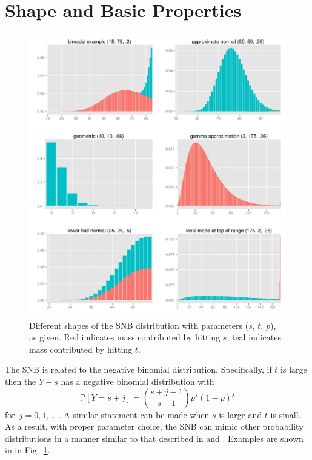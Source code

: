 \documentclass[review]{elsarticle}
\begin{document}
\section{Shape and Basic Properties}

\begin{figure}[p!]
\begin{center}
\includegraphics[width=\textwidth]{shapes.pdf}
\end{center}
\caption{Different shapes of the SNB distribution with parameters ($s$, $t$, $p$), as given. Red indicates mass contributed by hitting $s$, teal indicates
mass contributed by hitting $t$. \label{shapes.fig}}
\end{figure}

The SNB is related to the negative 
binomial distribution. Specifically, if $t$ is large then the $Y-s$ has a 
negative binomial distribution with
\begin{equation*}                                    %
\mathbb{P}[Y=s+j]        \label{nb1.eq}          
  = {{s+j-1}\choose{s-1}} p^s (1-p)^j
\end{equation*}
for $\,j=0, 1,\ldots\,$. A similar statement can be made when $s$ is large
and $t$ is small. As a result, with proper parameter choice, the SNB
can mimic other probability distributions in a manner similar to 
that described in \cite{Peizer1968} and \cite{Best1974}. Examples are
shown in in Fig.~\ref{shapes.fig}. 
\end{document}
